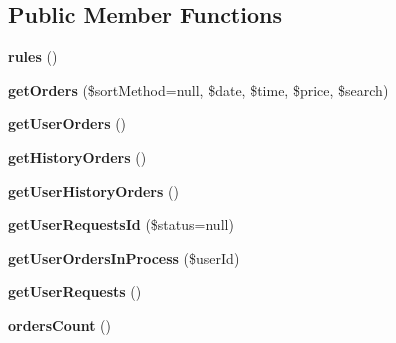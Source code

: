 \subsection*{Public Member Functions}
\begin{DoxyCompactItemize}
\item 
\hypertarget{classapp_1_1models_1_1_delivery_orders_a17dba92d96b9dd48c62f3ede3eef94d4}{}\label{classapp_1_1models_1_1_delivery_orders_a17dba92d96b9dd48c62f3ede3eef94d4} 
{\bfseries rules} ()
\item 
\hypertarget{classapp_1_1models_1_1_delivery_orders_a260288621b9c0c6f06b646f529721221}{}\label{classapp_1_1models_1_1_delivery_orders_a260288621b9c0c6f06b646f529721221} 
{\bfseries get\+Orders} (\$sort\+Method=null, \$date, \$time, \$price, \$search)
\item 
\hypertarget{classapp_1_1models_1_1_delivery_orders_a086cbd3798a8cf6d830dad6fb1612e63}{}\label{classapp_1_1models_1_1_delivery_orders_a086cbd3798a8cf6d830dad6fb1612e63} 
{\bfseries get\+User\+Orders} ()
\item 
\hypertarget{classapp_1_1models_1_1_delivery_orders_a08bac5dcb5e3342f2579685e1e992422}{}\label{classapp_1_1models_1_1_delivery_orders_a08bac5dcb5e3342f2579685e1e992422} 
{\bfseries get\+History\+Orders} ()
\item 
\hypertarget{classapp_1_1models_1_1_delivery_orders_a349504334b35d0f70ad125f6f8f6f2c4}{}\label{classapp_1_1models_1_1_delivery_orders_a349504334b35d0f70ad125f6f8f6f2c4} 
{\bfseries get\+User\+History\+Orders} ()
\item 
\hypertarget{classapp_1_1models_1_1_delivery_orders_a09c9cfa97d9cd97e55847fed54bbef96}{}\label{classapp_1_1models_1_1_delivery_orders_a09c9cfa97d9cd97e55847fed54bbef96} 
{\bfseries get\+User\+Requests\+Id} (\$status=null)
\item 
\hypertarget{classapp_1_1models_1_1_delivery_orders_a392acdf11aef3ebdb6d394e5f97d1dab}{}\label{classapp_1_1models_1_1_delivery_orders_a392acdf11aef3ebdb6d394e5f97d1dab} 
{\bfseries get\+User\+Orders\+In\+Process} (\$user\+Id)
\item 
\hypertarget{classapp_1_1models_1_1_delivery_orders_a7a254a52dadfcb4672de8791c6b0d5e8}{}\label{classapp_1_1models_1_1_delivery_orders_a7a254a52dadfcb4672de8791c6b0d5e8} 
{\bfseries get\+User\+Requests} ()
\item 
\hypertarget{classapp_1_1models_1_1_delivery_orders_ac1aeb6ab950d820bdaa381b8e58c0af4}{}\label{classapp_1_1models_1_1_delivery_orders_ac1aeb6ab950d820bdaa381b8e58c0af4} 
{\bfseries orders\+Count} ()
\end{DoxyCompactItemize}
